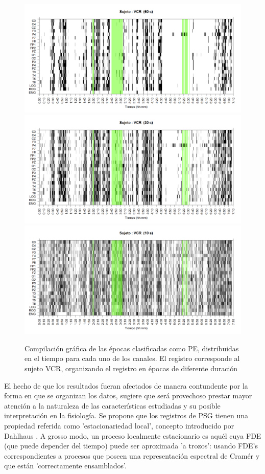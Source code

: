 \begin{figure}
\centering
\includegraphics[width=0.9\linewidth] 
{./img_ejemplos/VCNNS1_est_60.png} 
\\
\includegraphics[width=0.9\linewidth]
{./img_ejemplos/VCNNS1_est_30.png} 
\\
\includegraphics[width=0.9\linewidth]
{./img_ejemplos/VCNNS1_est_10.png} 
\caption{Compilaci\'on gr\'afica de las \'epocas clasificadas como PE, distribuidas en el tiempo
para cada uno de los canales. El registro corresponde al sujeto VCR, organizando el registro en
\'epocas de diferente duraci\'on}
\label{comp_VCR}
\end{figure}

El hecho de que los resultados fueran afectados de manera contundente por la forma en que se 
organizan los datos, sugiere que ser\'a provechoso prestar mayor atenci\'on a la naturaleza de las 
caracter\'isticas estudiadas y su posible interpretaci\'on en la fisiolog\'ia.
Se propone que los registros de PSG tienen una propiedad referida como 'estacionariedad local',
concepto introducido por Dahlhaus \cite{Dahlhaus97}.
A grosso modo, un proceso localmente estacionario es aqu\'el cuya FDE (que puede depender del 
tiempo) puede ser aproximada 'a trozos': usando FDE's correspondientes a procesos que poseen una 
representaci\'on espectral de Cram\'er y que est\'an 'correctamente ensamblados'.

